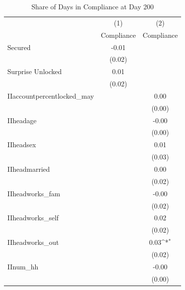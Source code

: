 \begin{table}[htbp]\centering
\def\sym#1{\ifmmode^{#1}\else\(^{#1}\)\fi}
\caption{Share of Days in Compliance at Day 200\label{compliance\_tab}}
\begin{tabular}{l*{2}{c}}
\toprule
                    &\multicolumn{1}{c}{(1)}&\multicolumn{1}{c}{(2)}\\
                    &\multicolumn{1}{c}{Compliance}&\multicolumn{1}{c}{Compliance}\\
\midrule
Secured             &       -0.01         &                     \\
                    &      (0.02)         &                     \\\addlinespace
Surprise Unlocked   &        0.01         &                     \\
                    &      (0.02)         &                     \\\addlinespace
IIaccountpercentlocked\_may&                     &        0.00         \\
                    &                     &      (0.00)         \\
IIheadage           &                     &       -0.00         \\
                    &                     &      (0.00)         \\
IIheadsex           &                     &        0.01         \\
                    &                     &      (0.03)         \\
IIheadmarried       &                     &        0.00         \\
                    &                     &      (0.02)         \\
IIheadworks\_fam     &                     &       -0.00         \\
                    &                     &      (0.02)         \\
IIheadworks\_self    &                     &        0.02         \\
                    &                     &      (0.02)         \\
IIheadworks\_out     &                     &        0.03\sym{*}  \\
                    &                     &      (0.02)         \\
IInum\_hh            &                     &       -0.00         \\
                    &                     &      (0.00)         \\

\end{tabular}
\end{table}
